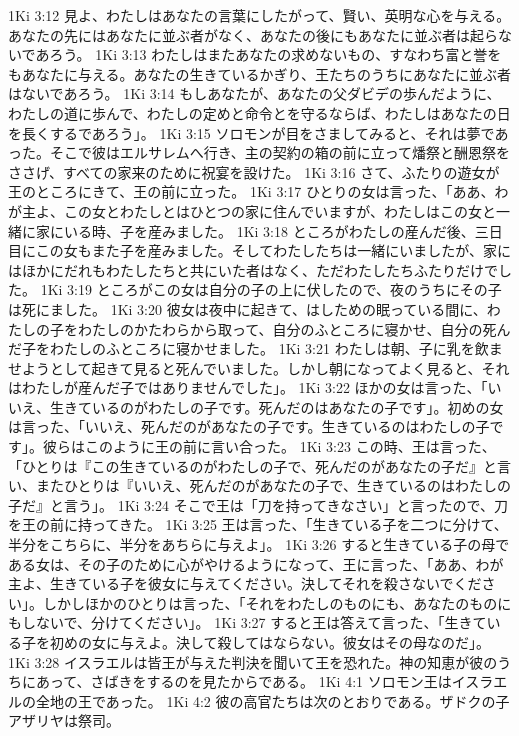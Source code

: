 1Ki 3:12  見よ、わたしはあなたの言葉にしたがって、賢い、英明な心を与える。あなたの先にはあなたに並ぶ者がなく、あなたの後にもあなたに並ぶ者は起らないであろう。
1Ki 3:13  わたしはまたあなたの求めないもの、すなわち富と誉をもあなたに与える。あなたの生きているかぎり、王たちのうちにあなたに並ぶ者はないであろう。
1Ki 3:14  もしあなたが、あなたの父ダビデの歩んだように、わたしの道に歩んで、わたしの定めと命令とを守るならば、わたしはあなたの日を長くするであろう」。
1Ki 3:15  ソロモンが目をさましてみると、それは夢であった。そこで彼はエルサレムへ行き、主の契約の箱の前に立って燔祭と酬恩祭をささげ、すべての家来のために祝宴を設けた。
1Ki 3:16  さて、ふたりの遊女が王のところにきて、王の前に立った。
1Ki 3:17  ひとりの女は言った、「ああ、わが主よ、この女とわたしとはひとつの家に住んでいますが、わたしはこの女と一緒に家にいる時、子を産みました。
1Ki 3:18  ところがわたしの産んだ後、三日目にこの女もまた子を産みました。そしてわたしたちは一緒にいましたが、家にはほかにだれもわたしたちと共にいた者はなく、ただわたしたちふたりだけでした。
1Ki 3:19  ところがこの女は自分の子の上に伏したので、夜のうちにその子は死にました。
1Ki 3:20  彼女は夜中に起きて、はしための眠っている間に、わたしの子をわたしのかたわらから取って、自分のふところに寝かせ、自分の死んだ子をわたしのふところに寝かせました。
1Ki 3:21  わたしは朝、子に乳を飲ませようとして起きて見ると死んでいました。しかし朝になってよく見ると、それはわたしが産んだ子ではありませんでした」。
1Ki 3:22  ほかの女は言った、「いいえ、生きているのがわたしの子です。死んだのはあなたの子です」。初めの女は言った、「いいえ、死んだのがあなたの子です。生きているのはわたしの子です」。彼らはこのように王の前に言い合った。
1Ki 3:23  この時、王は言った、「ひとりは『この生きているのがわたしの子で、死んだのがあなたの子だ』と言い、またひとりは『いいえ、死んだのがあなたの子で、生きているのはわたしの子だ』と言う」。
1Ki 3:24  そこで王は「刀を持ってきなさい」と言ったので、刀を王の前に持ってきた。
1Ki 3:25  王は言った、「生きている子を二つに分けて、半分をこちらに、半分をあちらに与えよ」。
1Ki 3:26  すると生きている子の母である女は、その子のために心がやけるようになって、王に言った、「ああ、わが主よ、生きている子を彼女に与えてください。決してそれを殺さないでください」。しかしほかのひとりは言った、「それをわたしのものにも、あなたのものにもしないで、分けてください」。
1Ki 3:27  すると王は答えて言った、「生きている子を初めの女に与えよ。決して殺してはならない。彼女はその母なのだ」。
1Ki 3:28  イスラエルは皆王が与えた判決を聞いて王を恐れた。神の知恵が彼のうちにあって、さばきをするのを見たからである。
1Ki 4:1  ソロモン王はイスラエルの全地の王であった。
1Ki 4:2  彼の高官たちは次のとおりである。ザドクの子アザリヤは祭司。
